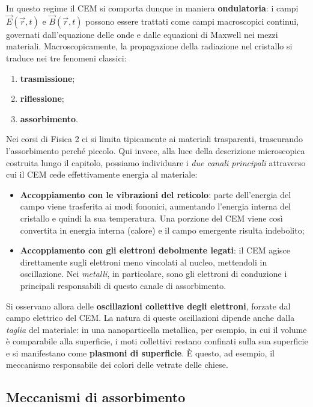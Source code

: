 In questo regime il CEM si comporta dunque in maniera \textbf{ondulatoria}: i campi \( \vec{E}(\vec{r}, t) \) e \( \vec{B}(\vec{r}, t) \) possono essere trattati come campi macroscopici continui, governati dall'equazione delle onde e dalle equazioni di Maxwell nei mezzi materiali. Macroscopicamente, la propagazione della radiazione nel cristallo si traduce nei tre fenomeni classici:

\begin{enumerate}
    \item \textbf{trasmissione};
    \item \textbf{riflessione};
    \item \textbf{assorbimento}.
\end{enumerate}

Nei corsi di Fisica 2 ci si limita tipicamente ai materiali trasparenti, trascurando l'assorbimento perché piccolo. Qui invece, alla luce della descrizione microscopica costruita lungo il capitolo, possiamo individuare i \emph{due canali principali} attraverso cui il CEM cede effettivamente energia al materiale:

\begin{itemize}
    \item \textbf{Accoppiamento con le vibrazioni del reticolo}: parte dell'energia del campo viene trasferita ai modi fononici, aumentando l'energia interna del cristallo e quindi la sua temperatura. Una porzione del CEM viene così convertita in energia interna (calore) e il campo emergente risulta indebolito;
    \item \textbf{Accoppiamento con gli elettroni debolmente legati}: il CEM agisce direttamente sugli elettroni meno vincolati al nucleo, mettendoli in oscillazione. Nei \emph{metalli}, in particolare, sono gli elettroni di conduzione i principali responsabili di questo canale di assorbimento.
\end{itemize}

Si osservano allora delle \textbf{oscillazioni collettive degli elettroni}, forzate dal campo elettrico del CEM. La natura di queste oscillazioni dipende anche dalla \emph{taglia} del materiale: in una nanoparticella metallica, per esempio, in cui il volume è comparabile alla superficie, i moti collettivi restano confinati sulla sua superficie e si manifestano come \textbf{plasmoni di superficie}. È questo, ad esempio, il meccanismo responsabile dei colori delle vetrate delle chiese.

\subsection{Meccanismi di assorbimento}

